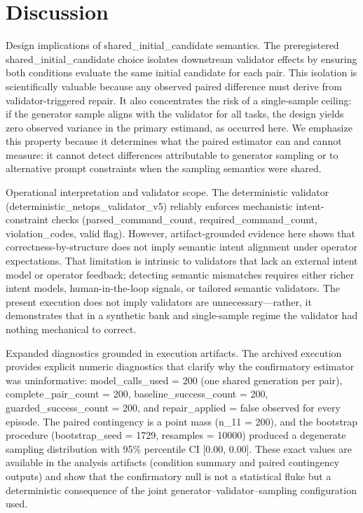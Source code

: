 \documentclass[conference]{IEEEtran}
\begin{document}
\section{Discussion}
Design implications of shared\_initial\_candidate semantics. The preregistered shared\_initial\_candidate choice isolates downstream validator effects by ensuring both conditions evaluate the same initial candidate for each pair. This isolation is scientifically valuable because any observed paired difference must derive from validator-triggered repair. It also concentrates the risk of a single-sample ceiling: if the generator sample aligns with the validator for all tasks, the design yields zero observed variance in the primary estimand, as occurred here. We emphasize this property because it determines what the paired estimator can and cannot measure: it cannot detect differences attributable to generator sampling or to alternative prompt constraints when the sampling semantics were shared.

Operational interpretation and validator scope. The deterministic validator (deterministic\_netops\_validator\_v5) reliably enforces mechanistic intent-constraint checks (parsed\_command\_count, required\_command\_count, violation\_codes, valid flag). However, artifact-grounded evidence here shows that correctness-by-structure does not imply semantic intent alignment under operator expectations. That limitation is intrinsic to validators that lack an external intent model or operator feedback; detecting semantic mismatches requires either richer intent models, human-in-the-loop signals, or tailored semantic validators. The present execution does not imply validators are unnecessary---rather, it demonstrates that in a synthetic bank and single-sample regime the validator had nothing mechanical to correct.

Expanded diagnostics grounded in execution artifacts. The archived execution provides explicit numeric diagnostics that clarify why the confirmatory estimator was uninformative: model\_calls\_used = 200 (one shared generation per pair), complete\_pair\_count = 200, baseline\_success\_count = 200, guarded\_success\_count = 200, and repair\_applied = false observed for every episode. The paired contingency is a point mass (n\_11 = 200), and the bootstrap procedure (bootstrap\_seed = 1729, resamples = 10000) produced a degenerate sampling distribution with 95\% percentile CI [0.00, 0.00]. These exact values are available in the analysis artifacts (condition summary and paired contingency outputs) and show that the confirmatory null is not a statistical fluke but a deterministic consequence of the joint generator--validator--sampling configuration used.
\end{document}
